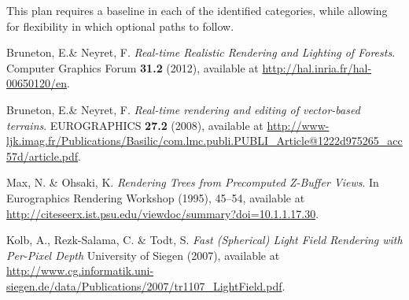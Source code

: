 \documentclass{article}
\begin{document}
This plan requires a baseline in each of the identified categories, while allowing for flexibility in which optional paths to follow.

\begin{thebibliography}{9}

  Bruneton, E.\& Neyret, F.
  \emph{Real-time Realistic Rendering and Lighting of Forests}.
  Computer Graphics Forum \textbf{31.2} (2012), available at
  \url{http://hal.inria.fr/hal-00650120/en}.

  Bruneton, E.\& Neyret, F.
  \emph{Real-time rendering and editing of vector-based terrains}.
  EUROGRAPHICS \textbf{27.2} (2008), available at
  \url{http://www-ljk.imag.fr/Publications/Basilic/com.lmc.publi.PUBLI_Article@1222d975265_acc57d/article.pdf}.

  Max, N. \& Ohsaki, K.
  \emph{Rendering Trees from Precomputed Z-Buffer Views}.
  In Eurographics Rendering Workshop (1995), 45--54, available at
  \url{http://citeseerx.ist.psu.edu/viewdoc/summary?doi=10.1.1.17.30}.

  Kolb, A., Rezk-Salama, C. \& Todt, S.
  \emph{Fast (Spherical) Light Field Rendering with Per-Pixel Depth}
  University of Siegen (2007), available at
  \url{http://www.cg.informatik.uni-siegen.de/data/Publications/2007/tr1107_LightField.pdf}.

\end{thebibliography}
\end{document}
